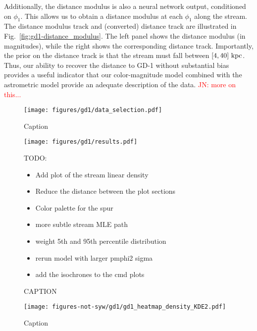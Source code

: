 \documentclass[twocolumn]{aastex631}
\newcommand{\JN}[1]{{\textcolor{red}{JN: #1}}}
\begin{document}
            Additionally, the distance modulus is also a neural network output, conditioned on $\phi_1$. This allows us to obtain a distance modulus at each $\phi_1$ along the stream. The distance modulus track and (converted) distance track are illustrated in Fig.~\ref{fig:gd1-distance_modulus}. The left panel shows the distance modulus (in magnitudes), while the right shows the corresponding distance track. Importantly, the prior on the distance track is that the stream must fall between $[4,40]~\rm{kpc}$. Thus, our ability to recover the distance to GD-1 without substantial bias provides a useful indicator that our color-magnitude model combined with the astrometric model provide an adequate description of the data. \JN{more on this...}

            \begin{figure*}[h]
                \centering
                \texttt{[image: figures/gd1/data\_selection.pdf]}
                \caption{Caption}
                \label{fig:gd1-data_selection}
            \end{figure*}

            \begin{figure*}[h]
                \centering
                \texttt{[image: figures/gd1/results.pdf]}
                \caption{CAPTION}
                TODO:
                \begin{itemize}
                    \item Add plot of the stream linear density
                    \item Reduce the distance between the plot sections
                    \item Color palette for the spur
                    \item more subtle stream MLE path
                    \item weight 5th and 95th percentile distribution
                    \item rerun model with larger pmphi2 sigma
                    \item add the isochrones to the cmd plots
                \end{itemize}
                \label{fig:gd1-results}
            \end{figure*}
    
            \begin{figure*}
                \centering
                \texttt{[image: figures-not-syw/gd1/gd1\_heatmap\_density\_KDE2.pdf]}
                \caption{Caption}
                \label{fig:gd1-heatmap}
            \end{figure*}
\end{document}
